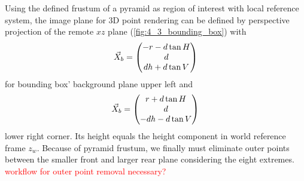 \documentclass[review]{elsarticle}
\begin{document}
Using the defined frustum of a pyramid as region of interest with local reference system, the image plane for 3D point rendering can be defined by perspective projection of the remote $xz$ plane (\ref{fig:4_3_bounding_box}) with 
\begin{equation}
\vec{X}_b = \begin{pmatrix}
-r - d \tan H \\
d \\
dh + d \tan V
\end{pmatrix}
\notag
\end{equation} 
for bounding box' background plane upper left and 
\begin{equation}
\vec{X}_b =\begin{pmatrix}
r + d \tan H\\
d\\
-dh - d \tan V
\end{pmatrix}
\notag
\end{equation} 
lower right corner. Its height equals the height component in world reference frame $z_w$. Because of pyramid frustum, we finally must eliminate outer points between the smaller front and larger rear plane considering the eight extremes. \textcolor{red}{workflow for outer point removal necessary?}
\end{document}
